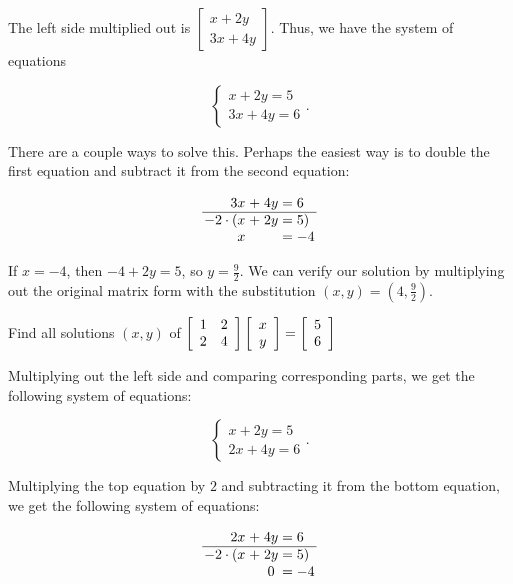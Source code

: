\documentclass[../key.tex]{subfiles}
\begin{document}
The left side multiplied out is $\begin{bmatrix} x+2y \\ 3x+4y \end{bmatrix}$. Thus, we have the system of equations

$$\begin{cases}x+2y=5 \\ 3x+4y=6 \end{cases}.$$

There are a couple ways to solve this. Perhaps the easiest way is to double the first equation and subtract it from the second equation:

$$\arraycolsep=1.4pt\begin{array}{rcccl}
3x & + & 4y & = & 6 \\ \hline
-2\cdot ( x & + & 2y & = & 5) \\
x & & & = & -4 \\
\end{array}$$

If $x=-4$, then $-4+2y=5$, so $y=\frac{9}{2}$. We can verify our solution by multiplying out the original matrix form with the substitution $(x,y)=\left(4,\frac{9}{2}\right)$.

\begin{inner_problem}
\item \label{prob:needed_for_matrix_undo4}Find all solutions $(x,y)$ of $\left[\begin{array}{cc} 1 & 2 \\ 2 & 4 \end{array}\right]\left[\begin{array}{c} x \\ y \end{array}\right]=\left[\begin{array}{c} 5 \\ 6 \end{array}\right]$
\end{inner_problem}

Multiplying out the left side and comparing corresponding parts, we get the following system of equations:

$$\begin{cases} x + 2y = 5 \\ 2x + 4y = 6 \end{cases}.$$

Multiplying the top equation by $2$ and subtracting it from the bottom equation, we get the following system of equations:

$$\arraycolsep=1.4pt\begin{array}{rcccl}
2x & + & 4y & = & 6 \\ \hline
-2\cdot ( x & + & 2y & = & 5) \\
& & 0 & = & -4 \\
\end{array}$$
\end{document}
